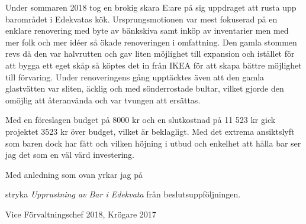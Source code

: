 \documentclass[../_main/handlingar.tex]{subfiles}
\begin{document}
Under sommaren 2018 tog en brokig skara E:are på sig uppdraget att rusta upp barområdet i Edekvatas kök. Ursprungsmotionen var mest fokuserad på en enklare renovering med byte av bänkskiva samt inköp av inventarier men med mer folk och mer idéer så ökade renoveringen i omfattning. Den gamla stommen revs då den var halvrutten och gav liten möjlighet till expansion och istället för att bygga ett eget skåp så köptes det in från IKEA för att skapa bättre möjlighet till förvaring. Under renoveringens gång upptäcktes även att den gamla glastvätten var sliten, äcklig och med sönderrostade bultar, vilket gjorde den omöjlig att återanvända och var tvungen att ersättas.

Med en föreslagen budget på 8000 kr och en slutkostnad på 11 523 kr gick projektet 3523 kr över budget, vilket är beklagligt. Med det extrema ansiktslyft som baren dock har fått och vilken höjning i utbud och enkelhet att hålla bar ser jag det som en väl värd investering.

Med anledning som ovan yrkar jag på
\begin{attsatser}
    \att stryka \emph{Upprustning av Bar i Edekvata} från beslutsuppföljningen.
\end{attsatser}

\begin{signatures}{3}
    \mvh
	\signature{Markus Rahne}{Vice Förvaltningschef 2018, Krögare 2017}
\end{signatures}
\end{document}
